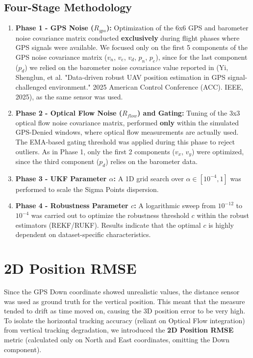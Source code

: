 \documentclass{article}
\begin{document}
\subsection*{Four-Stage Methodology}
\begin{enumerate}
    \item \textbf{Phase 1 - GPS Noise ($R_{gps}$):} Optimization of the 6x6 GPS and barometer noise covariance matrix conducted \textbf{exclusively} during flight phases where GPS signals were available. We focused only on the first 5 components of the GPS noise covariance matrix ($v_n$, $v_e$, $v_d$, $p_n$, $p_e$), since for the last component ($p_d$) we relied on the barometer noise covariance value reported in (Yi, Shenglun, et al. "Data-driven robust UAV position estimation in GPS signal-challenged environment." 2025 American Control Conference (ACC). IEEE, 2025), as the same sensor was used.
    \item \textbf{Phase 2 - Optical Flow Noise ($R_{flow}$) and Gating:} Tuning of the 3x3 optical flow noise covariance matrix, performed \textbf{only} within the simulated GPS-Denied windows, where optical flow measurements are actually used. The EMA-based gating threshold was applied during this phase to reject outliers. As in Phase 1, only the first 2 components ($v_x$, $v_y$) were optimized, since the third component ($p_d$) relies on the barometer data.
    \item \textbf{Phase 3 - UKF Parameter $\alpha$:} A 1D grid search over $\alpha \in [10^{-4}, 1]$ was performed to scale the Sigma Points dispersion.
    \item \textbf{Phase 4 - Robustness Parameter $c$:} A logarithmic sweep from $10^{-12}$ to $10^{-4}$ was carried out to optimize the robustness threshold $c$ within the robust estimators (REKF/RUKF). Results indicate that the optimal $c$ is highly dependent on dataset-specific characteristics.
\end{enumerate}

\section*{2D Position RMSE}

Since the GPS Down coordinate showed unrealistic values, the distance sensor 
was used as ground truth for the vertical position.
This meant that the measure tended to drift as time moved on, causing the 3D position error to be very high. To isolate the horizontal tracking accuracy (reliant on Optical Flow integration) from vertical tracking degradation, we introduced the \textbf{2D Position RMSE} metric (calculated only on North and East coordinates, omitting the Down component).
\end{document}
